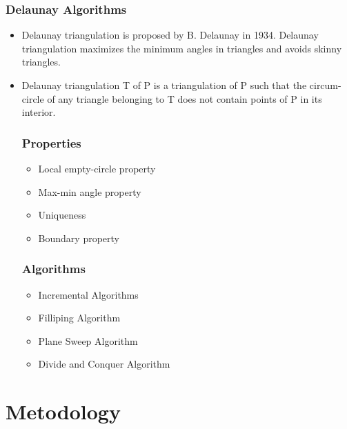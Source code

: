 \documentclass[conference]{IEEEtran}
\begin{document}
    \subsubsection{\textbf{Delaunay Algorithms}}
    \begin{itemize}
        \item Delaunay triangulation is proposed by B. Delaunay in 1934. Delaunay triangulation maximizes the minimum angles in triangles and avoids skinny triangles.
        \item Delaunay triangulation T of P is a triangulation of P such that the circum-circle of any triangle belonging to T does not contain points of P in its interior.
        \subsubsection{Properties}
        \begin{itemize}
            \item Local empty-circle property
            \item Max-min angle property
            \item Uniqueness
            \item Boundary property
        \end{itemize}
        \subsubsection{Algorithms}
        \begin{itemize}
            \item Incremental Algorithms
            \item Filliping Algorithm
            \item Plane Sweep Algorithm
            \item Divide and Conquer Algorithm
        \end{itemize}
    \end{itemize}
    

\section{Metodology}
\end{document}
